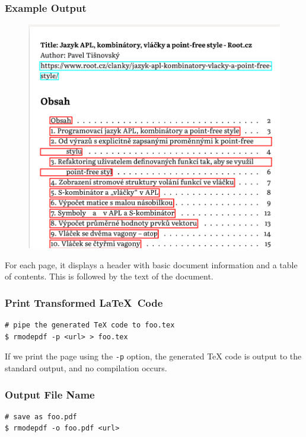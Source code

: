 \begin{frame}[fragile]
  \frametitle{Example Output}
  \begin{figure}
    \begin{center}
      \includegraphics[height=0.7\textheight]{img/rmodepdf-article.png}
    \end{center}
  \end{figure}
  
\end{frame}

For each page, it displays a header with basic document information and a table
of contents. This is followed by the text of the document.



\begin{frame}[fragile]
  \frametitle{Print Transformed \LaTeX\ Code}
\begin{verbatim}
# pipe the generated TeX code to foo.tex
$ rmodepdf -p <url> > foo.tex
\end{verbatim}
\end{frame}

If we print the page using the \verb|-p| option, the generated TeX code is output to the standard output, and no compilation occurs.



\begin{frame}[fragile]
  \frametitle{Output File Name}
  \begin{verbatim}
# save as foo.pdf
$ rmodepdf -o foo.pdf <url>
  \end{verbatim}

\end{frame}

